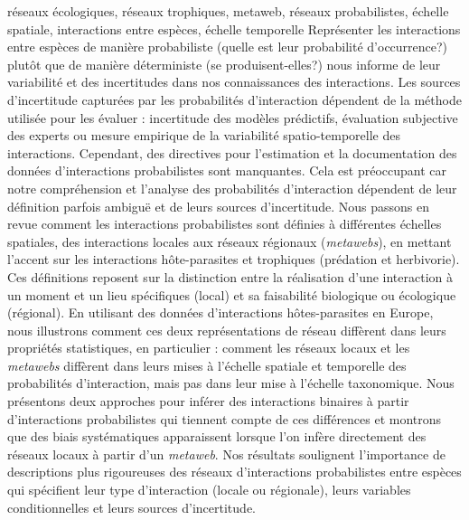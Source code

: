\begin{resume}{réseaux écologiques, réseaux trophiques, metaweb, réseaux probabilistes, échelle spatiale, interactions entre espèces, échelle temporelle}
  Représenter les interactions entre espèces de manière probabiliste (quelle est
  leur probabilité d'occurrence?) plutôt que de manière déterministe (se
  produisent-elles?) nous informe de leur variabilité et des incertitudes dans
  nos connaissances des interactions. Les sources d'incertitude capturées par
  les probabilités d'interaction dépendent de la méthode utilisée pour les
  évaluer : incertitude des modèles prédictifs, évaluation subjective des
  experts ou mesure empirique de la variabilité spatio-temporelle des
  interactions. Cependant, des directives pour l'estimation et la documentation
  des données d'interactions probabilistes sont manquantes. Cela est préoccupant
  car notre compréhension et l'analyse des probabilités d'interaction dépendent
  de leur définition parfois ambiguë et de leurs sources d'incertitude. Nous
  passons en revue comment les interactions probabilistes sont définies à
  différentes échelles spatiales, des interactions locales aux réseaux régionaux
  (\textit{metawebs}), en mettant l'accent sur les interactions hôte-parasites
  et trophiques (prédation et herbivorie). Ces définitions reposent sur la
  distinction entre la réalisation d'une interaction à un moment et un lieu
  spécifiques (local) et sa faisabilité biologique ou écologique (régional). En
  utilisant des données d'interactions hôtes-parasites en Europe, nous
  illustrons comment ces deux représentations de réseau diffèrent dans leurs
  propriétés statistiques, en particulier : comment les réseaux locaux et les
  \textit{metawebs} diffèrent dans leurs mises à l'échelle spatiale et
  temporelle des probabilités d'interaction, mais pas dans leur mise à l'échelle
  taxonomique. Nous présentons deux approches pour inférer des interactions
  binaires à partir d'interactions probabilistes qui tiennent compte de ces
  différences et montrons que des biais systématiques apparaissent lorsque l'on
  infère directement des réseaux locaux à partir d'un \textit{metaweb}. Nos
  résultats soulignent l'importance de descriptions plus rigoureuses des réseaux
  d'interactions probabilistes entre espèces qui spécifient leur type
  d'interaction (locale ou régionale), leurs variables conditionnelles et leurs
  sources d'incertitude.
\end{resume}

